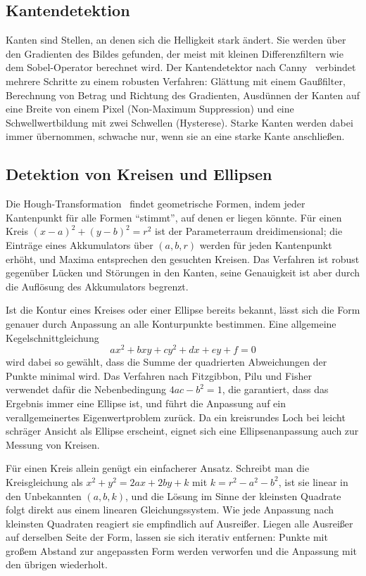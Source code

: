 \subsection{Kantendetektion}

Kanten sind Stellen, an denen sich die Helligkeit stark ändert. Sie werden über den Gradienten
des Bildes gefunden, der meist mit kleinen Differenzfiltern wie dem Sobel-Operator berechnet
wird. Der Kantendetektor nach Canny~\cite{canny1986} verbindet mehrere Schritte zu einem
robusten Verfahren: Glättung mit einem Gaußfilter, Berechnung von Betrag und Richtung des
Gradienten, Ausdünnen der Kanten auf eine Breite von einem Pixel (Non-Maximum Suppression) und
eine Schwellwertbildung mit zwei Schwellen (Hysterese). Starke Kanten werden dabei immer
übernommen, schwache nur, wenn sie an eine starke Kante anschließen.

\subsection{Detektion von Kreisen und Ellipsen}

Die Hough-Transformation~\cite{duda1972} findet geometrische Formen, indem jeder Kantenpunkt
für alle Formen \enquote{stimmt}, auf denen er liegen könnte. Für einen Kreis
$(x - a)^2 + (y - b)^2 = r^2$ ist der Parameterraum dreidimensional; die Einträge eines
Akkumulators über $(a, b, r)$ werden für jeden Kantenpunkt erhöht, und Maxima entsprechen den
gesuchten Kreisen. Das Verfahren ist robust gegenüber Lücken und Störungen in den Kanten, seine
Genauigkeit ist aber durch die Auflösung des Akkumulators begrenzt.

Ist die Kontur eines Kreises oder einer Ellipse bereits bekannt, lässt sich die Form
genauer durch Anpassung an alle Konturpunkte bestimmen. Eine allgemeine Kegelschnittgleichung
\begin{equation}
  a x^2 + b x y + c y^2 + d x + e y + f = 0
\end{equation}
wird dabei so gewählt, dass die Summe der quadrierten Abweichungen der Punkte minimal wird.
Das Verfahren nach Fitzgibbon, Pilu und Fisher~\cite{fitzgibbon1999} verwendet dafür die
Nebenbedingung $4ac - b^2 = 1$, die garantiert, dass das Ergebnis immer eine Ellipse ist, und
führt die Anpassung auf ein verallgemeinertes Eigenwertproblem zurück. Da ein kreisrundes Loch
bei leicht schräger Ansicht als Ellipse erscheint, eignet sich eine Ellipsenanpassung auch
zur Messung von Kreisen.

Für einen Kreis allein genügt ein einfacherer Ansatz. Schreibt man die Kreisgleichung als
$x^2 + y^2 = 2ax + 2by + k$ mit $k = r^2 - a^2 - b^2$, ist sie linear in den Unbekannten
$(a, b, k)$, und die Lösung im Sinne der kleinsten Quadrate folgt direkt aus einem linearen
Gleichungssystem. Wie jede Anpassung nach kleinsten Quadraten reagiert sie empfindlich auf
Ausreißer. Liegen alle Ausreißer auf derselben Seite der Form, lassen sie sich iterativ
entfernen: Punkte mit großem Abstand zur angepassten Form werden verworfen und die Anpassung
mit den übrigen wiederholt.

